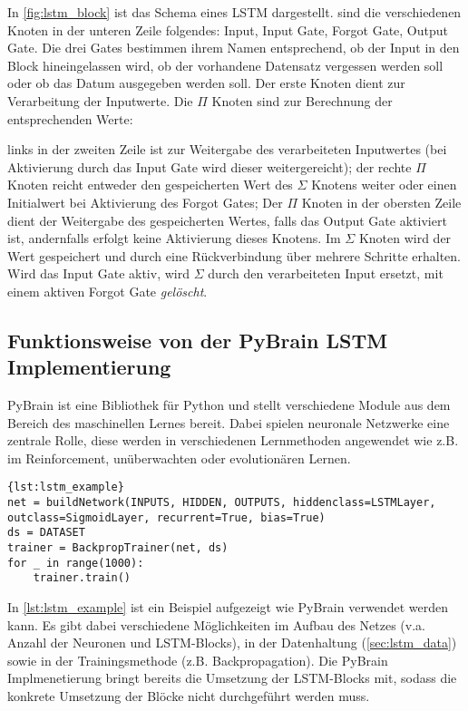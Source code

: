 In \autoref{fig:lstm_block} ist das Schema eines \ac{LSTM} dargestellt. sind die
verschiedenen Knoten in der unteren Zeile folgendes: Input, Input Gate, Forgot
Gate, Output Gate. Die drei Gates bestimmen ihrem Namen entsprechend, ob der
Input in den Block hineingelassen wird, ob der vorhandene Datensatz vergessen
werden soll oder ob das Datum ausgegeben werden soll. Der erste Knoten dient zur
Verarbeitung der Inputwerte. Die $\Pi$ Knoten sind zur Berechnung der
entsprechenden Werte:

links in der zweiten Zeile ist zur Weitergabe des verarbeiteten Inputwertes
(bei Aktivierung durch das Input Gate wird dieser weitergereicht); der rechte
$\Pi$ Knoten reicht entweder den gespeicherten Wert des $\Sigma$ Knotens weiter
oder einen Initialwert bei Aktivierung des Forgot Gates; Der $\Pi$ Knoten in der
obersten Zeile dient der Weitergabe des gespeicherten Wertes, falls das Output
Gate aktiviert ist, andernfalls erfolgt keine Aktivierung dieses Knotens. Im
$\Sigma$ Knoten wird der Wert gespeichert und durch eine Rückverbindung über
mehrere Schritte erhalten. Wird das Input Gate aktiv, wird $\Sigma$ durch den
verarbeiteten Input ersetzt, mit einem aktiven Forgot Gate \textit{gelöscht}. 


\subsection{Funktionsweise von der \acs{PyBrain} \acs{LSTM} Implementierung}
\ac{PyBrain}\cite{schaul2010} ist eine Bibliothek für Python und stellt
verschiedene Module aus dem Bereich des maschinellen Lernes bereit. Dabei
spielen neuronale Netzwerke eine zentrale Rolle, diese werden in verschiedenen
Lernmethoden angewendet wie z.B. im Reinforcement, unüberwachten oder
evolutionären Lernen.

\begin{lstlisting}[caption={Aufbau eines LSTM Netzes},label={lst:lstm_example}]{lst:lstm_example} 
net = buildNetwork(INPUTS, HIDDEN, OUTPUTS, hiddenclass=LSTMLayer,
outclass=SigmoidLayer, recurrent=True, bias=True) 
ds = DATASET 
trainer = BackpropTrainer(net, ds)
for _ in range(1000):
    trainer.train()
\end{lstlisting}

In \autoref{lst:lstm_example} ist ein Beispiel aufgezeigt wie \ac{PyBrain}
verwendet werden kann. Es gibt dabei verschiedene Möglichkeiten im Aufbau des
Netzes (v.a. Anzahl der Neuronen und \ac{LSTM}-Blocks), in der Datenhaltung
(\ref{sec:lstm_data}) sowie in der Trainingsmethode (z.B. Backpropagation).
Die \ac{PyBrain} Implmenetierung bringt bereits die Umsetzung der
\ac{LSTM}-Blocks mit, sodass die konkrete Umsetzung der Blöcke nicht
durchgeführt werden muss.

